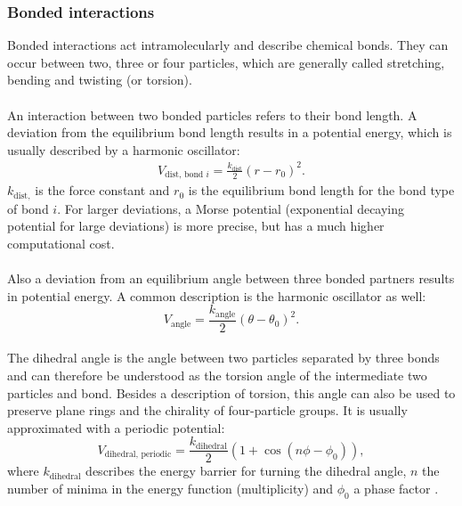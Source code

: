 \subsubsection{Bonded interactions}
Bonded interactions act intramolecularly and describe chemical bonds. They can occur between two, three or four particles, which are generally called stretching, bending and twisting (or torsion).\\%
\\
An interaction between two bonded particles refers to their bond length. A deviation from the equilibrium bond length results in a potential energy, which is usually described by a harmonic oscillator:
\begin{align}
V_{\text{dist, bond }i} = \frac{k_{\text{dist}}}{2}\left( r - r_{0} \right)^2.
\end{align}
$k_{\text{dist,}}$ is the force constant and $r_0$ is the equilibrium bond length for the bond type of bond $i$. For larger deviations, a Morse potential (exponential decaying potential for large deviations) is more precise, but has a much higher computational cost.\\
\\
Also a deviation from an equilibrium angle between three bonded partners results in potential energy. A common description is the harmonic oscillator as well:
\begin{equation}
V_\text{angle} = \frac{k_\text{angle}}{2}\left( \theta - \theta_0 \right)^2 .
\end{equation}%
\\
The dihedral angle is the angle between two particles separated by three bonds and can therefore be understood as the torsion angle of the intermediate two particles and bond.%
Besides a description of torsion, this angle can also be used to preserve plane rings and the chirality of four-particle groups. It is usually approximated with a periodic potential:
\begin{equation}
V_{\text{dihedral, periodic}} = \frac{k_\text{dihedral}}{2}\left(1 + \cos\left(n \phi - \phi_0 \right)\right),
\end{equation}
where $k_\text{dihedral}$ describes the energy barrier for turning the dihedral angle, $n$ the number of minima in the energy function (multiplicity) and $\phi_0$ a phase factor \autocite[p. 71-83]{gromacsManual}.
